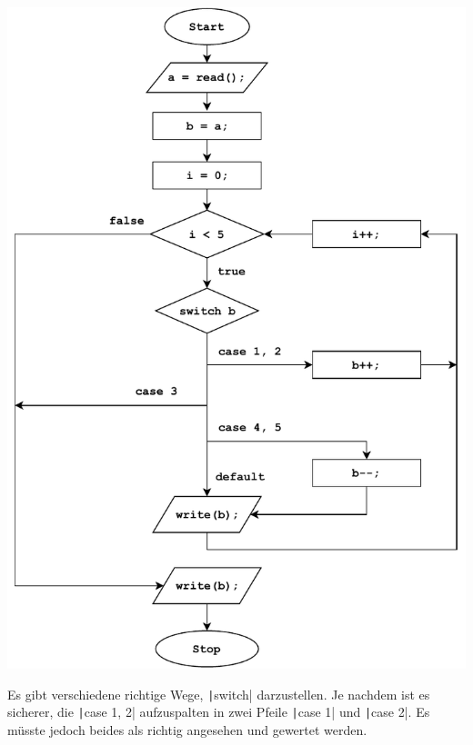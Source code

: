 \documentclass[11pt]{exam} %
\newcommand{\code}[1]{\texttt|#1|}
\begin{document}
\begin{questions}
\begin{solution}
\includegraphics[width=\linewidth]{kontrollfluss.pdf}\par
Es gibt verschiedene richtige Wege, \code{switch} darzustellen. Je nachdem ist es sicherer, die \code{case 1, 2} aufzuspalten in zwei Pfeile \code{case 1} und \code{case 2}. Es müsste jedoch beides als richtig angesehen und gewertet werden.
\end{solution}

\end{questions}
\end{document}
